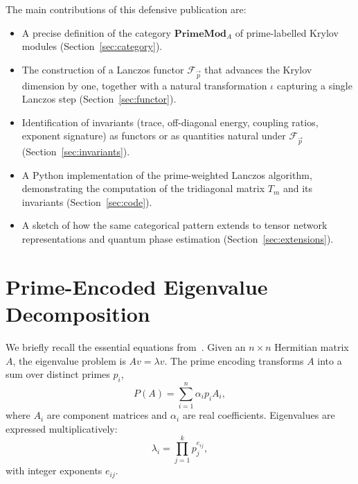 \documentclass[12pt]{article}
\theoremstyle{plain}
\theoremstyle{definition}
\theoremstyle{remark}
\begin{document}
The main contributions of this defensive publication are:
\begin{itemize}[nosep]
\item A precise definition of the category $\mathbf{PrimeMod}_A$ of prime-labelled Krylov modules (Section~\ref{sec:category}).
\item The construction of a Lanczos functor $\mathcal{F}_{\vec{p}}$ that advances the Krylov dimension by one, together with a natural transformation $\iota$ capturing a single Lanczos step (Section~\ref{sec:functor}).
\item Identification of invariants (trace, off-diagonal energy, coupling ratios, exponent signature) as functors or as quantities natural under $\mathcal{F}_{\vec{p}}$ (Section~\ref{sec:invariants}).
\item A Python implementation of the prime-weighted Lanczos algorithm, demonstrating the computation of the tridiagonal matrix $T_m$ and its invariants (Section~\ref{sec:code}).
\item A sketch of how the same categorical pattern extends to tensor network representations and quantum phase estimation (Section~\ref{sec:extensions}).
\end{itemize}

\section{Prime-Encoded Eigenvalue Decomposition}\label{sec:peed}
We briefly recall the essential equations from~\cite{vangelder2024}.
Given an $n\times n$ Hermitian matrix $A$, the eigenvalue problem is $Av = \lambda v$.
The prime encoding transforms $A$ into a sum over distinct primes $p_i$,
\[
P(A) = \sum_{i=1}^n \alpha_i p_i A_i,
\]
where $A_i$ are component matrices and $\alpha_i$ are real coefficients.
Eigenvalues are expressed multiplicatively:
\[
\lambda_i = \prod_{j=1}^k p_j^{e_{ij}},
\]
with integer exponents $e_{ij}$.
\end{document}
